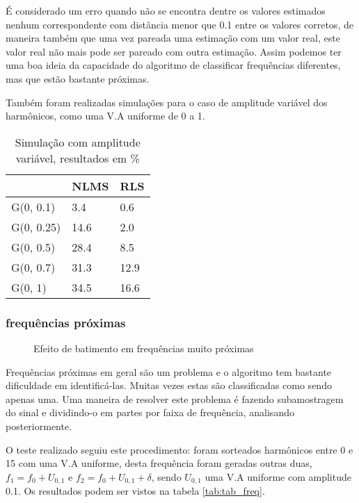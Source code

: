 \documentclass[a4paper, 12pt]{book}
\begin{document}
\indent É considerado um erro quando não se encontra dentre os valores estimados nenhum correspondente com distância menor que 0.1 entre os valores corretos, de maneira também que uma vez pareada uma estimação com um valor real, este valor real não mais pode ser pareado com outra estimação. Assim podemos ter uma boa ideia da capacidade do algoritmo de classificar frequências diferentes, mas que estão bastante próximas.

\indent Também foram realizadas simulações para o caso de amplitude variável dos harmônicos, como uma V.A uniforme de 0 a 1.

\begin{table}[H]
	\centering
	\begin{tabular}{l|l|l}
		& NLMS & RLS \\
		\hline 
		G(0, 0.1)  & 3.4    & 0.6 \\
		G(0, 0.25) & 14.6   & 2.0  \\
		G(0, 0.5)  & 28.4  & 8.5  \\
		G(0, 0.7)  & 31.3  & 12.9  \\
		G(0, 1)    & 34.5  & 16.6 \\ 
	\end{tabular}
\caption{Simulação com amplitude variável, resultados em \%}
\end{table}

\subsubsection{frequências próximas}

\begin{figure}[h]
	\centering    
	\def\svgwidth{\columnwidth}
	
	\caption{Efeito de batimento em frequências muito próximas}
	\label{fig:your image label}
\end{figure}

\indent Frequências próximas em geral são um problema e o algoritmo tem bastante dificuldade em identificá-las. Muitas vezes estas são classificadas como sendo apenas uma. Uma maneira de resolver este problema é fazendo subamostragem do sinal e dividindo-o em partes por faixa de frequência, analisando posteriormente.

\indent O teste realizado seguiu este procedimento: foram sorteados harmônicos entre 0 e 15 com uma V.A uniforme, desta frequência foram geradas outras duas, $f_1=f_0+U_{0,1}$ e $f_2=f_0+U_{0,1}+\delta$, sendo $U_{0,1}$ uma V.A uniforme com amplitude 0.1. Os resultados podem ser vistos na tabela \ref{tab:tab_freq}.
\end{document}
